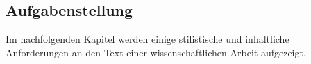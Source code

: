 \subsection{Aufgabenstellung}


Im nachfolgenden Kapitel werden einige stilistische und inhaltliche Anforderungen an den Text einer wissenschaftlichen Arbeit aufgezeigt.